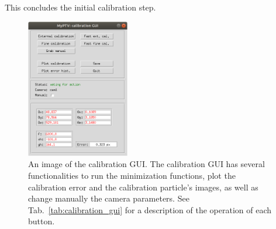 \documentclass[10pt,a4paper]{article}
\begin{document}
This concludes the initial calibration step.






\begin{figure}
	\centering
	\includegraphics[width=0.4\textwidth]{calibration_gui.png}
	\caption{An image of the calibration GUI. The calibration GUI has several functionalities to run the minimization functions, plot the calibration error and the calibration particle's images, as well as change manually the camera parameters. See Tab.~\ref{tab:calibration_gui} for a description of the operation of each button. \label{fig:calibration_gui}}
\end{figure}
\end{document}
